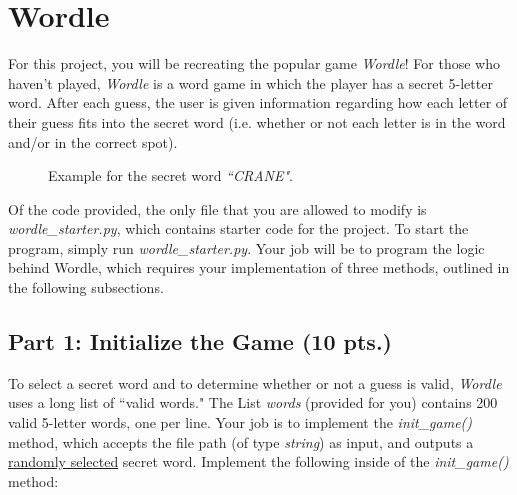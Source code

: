\documentclass{article}
\begin{document}
\pagestyle{fancy}

\section{Wordle}
\hspace{\parindent}For this project, you will be recreating the popular game \emph{Wordle}! For those who haven't played, \emph{Wordle} is a word game in which the player has a secret 5-letter word. After each guess, the user is given information regarding how each letter of their guess fits into the secret word (i.e. whether or not each letter is in the word and/or in the correct spot).

\vspace{0.5cm}

\begin{figure}[h!]
    \centering
    \caption{Example for the secret word \emph{``CRANE"}.}
\end{figure}

\vspace{1cm}

Of the code provided, the only file that you are allowed to modify is \emph{wordle\_starter.py}, which contains starter code for the project. To start the program, simply run \emph{wordle\_starter.py}. Your job will be to program the logic behind Wordle, which requires your implementation of three methods, outlined in the following subsections.

\subsection{Part 1: Initialize the Game (10 pts.)}
\hspace{\parindent} To select a secret word and to determine whether or not a guess is valid, \emph{Wordle} uses a long list of ``valid words." The List \emph{words} (provided for you) contains 200 valid 5-letter words, one per line. Your job is to implement the \emph{init\_game()} method, which accepts the file path  (of type \emph{string}) as input, and outputs a \underline{randomly selected} secret word. Implement the following inside of the \emph{init\_game()} method:
\end{document}
